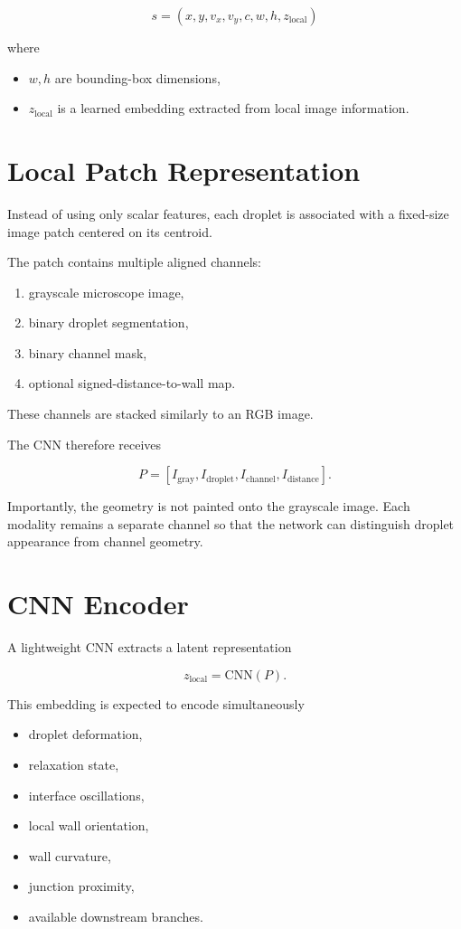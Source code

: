 \documentclass[11pt]{article}
\begin{document}
\[
s=(x,y,v_x,v_y,c,w,h,z_{\mathrm{local}})
\]

where

\begin{itemize}
\item $w,h$ are bounding-box dimensions,
\item $z_{\mathrm{local}}$ is a learned embedding extracted from local image information.
\end{itemize}

\section{Local Patch Representation}

Instead of using only scalar features, each droplet is associated with a fixed-size image patch centered on its centroid.

The patch contains multiple aligned channels:

\begin{enumerate}
\item grayscale microscope image,
\item binary droplet segmentation,
\item binary channel mask,
\item optional signed-distance-to-wall map.
\end{enumerate}

These channels are stacked similarly to an RGB image.

The CNN therefore receives

\[
P=
\left[
I_{\mathrm{gray}},
I_{\mathrm{droplet}},
I_{\mathrm{channel}},
I_{\mathrm{distance}}
\right].
\]

Importantly, the geometry is not painted onto the grayscale image. Each modality remains a separate channel so that the network can distinguish droplet appearance from channel geometry.

\section{CNN Encoder}

A lightweight CNN extracts a latent representation

\[
z_{\mathrm{local}}=\mathrm{CNN}(P).
\]

This embedding is expected to encode simultaneously

\begin{itemize}
\item droplet deformation,
\item relaxation state,
\item interface oscillations,
\item local wall orientation,
\item wall curvature,
\item junction proximity,
\item available downstream branches.
\end{itemize}
\end{document}
